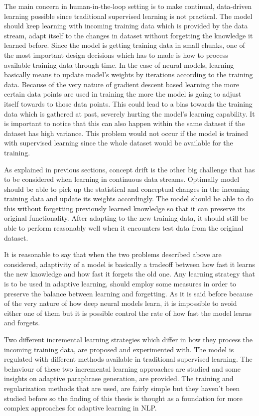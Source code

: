 The main concern in human-in-the-loop setting is to make continual, data-driven learning possible since traditional supervised learning is not practical. The model should keep learning with incoming training data which is provided by the data stream, adapt itself to the changes in dataset without forgetting the knowledge it learned before. Since the model is getting training data in small chunks, one of the most important design decisions which has to made is how to process available training data through time. In the case of neural models, learning basically means to update model's weights by iterations according to the training data. Because of the very nature of gradient descent based learning the more certain data points are used in training the more the model is going to adjust itself towards to those data points. This could lead to a bias towards the training data which is gathered at past, severely hurting the model's learning capability. It is important to notice that this can also happen within the same dataset if the dataset has high variance. This problem would not occur if the model is trained with supervised learning since the whole dataset would be available for the training.

As explained in previous sections, concept drift is the other big challenge that has to be considered when learning in continuous data streams. Optimally model should be able to pick up the statistical and conceptual changes in the incoming training data and update its weights accordingly. The model should be able to do this without forgetting previously learned knowledge so that it can preserve its original functionality. After adapting to the new training data, it should still be able to perform reasonably well when it encounters test data from the original dataset. 

It is reasonable to say that when the two problems described above are considered, adaptivity of a model is basically a tradeoff between how fast it learns the new knowledge and how fast it forgets the old one. Any learning strategy that is to be used in adaptive learning, should employ some measures in order to preserve the balance between learning and forgetting. As it is said before because of the very nature of how deep neural models learn, it is impossible to avoid either one of them but it is possible control the rate of how fast the model learns and forgets.

Two different incremental learning strategies which differ in how they process the incoming training data, are proposed and experimented with. The model is regulated with different methods available in traditional supervised learning. The behaviour of these two incremental learning approaches are studied and some insights on adaptive paraphrase generation, are provided. The training and regularization methods that are used, are fairly simple but they haven't been studied before so the finding of this thesis is thought as a foundation for more complex approaches for adaptive learning in NLP.

